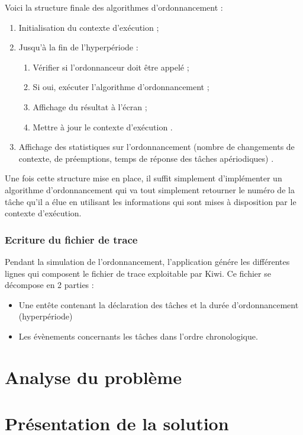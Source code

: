 				Voici la structure finale des algorithmes d'ordonnancement :
				\begin{enumerate}
					\item Initialisation du contexte d'exécution ;
					\item Jusqu'à la fin de l'hyperpériode :
					\begin{enumerate}
						\item Vérifier si l'ordonnanceur doit être appelé ;
						\item Si oui, exécuter l'algorithme d'ordonnancement ;
						\item Affichage du résultat à l'écran ;
						\item Mettre à jour le contexte d'exécution .
					\end{enumerate}
					\item Affichage des statistiques sur l'ordonnancement (nombre de changements de contexte, de préemptions, temps de réponse des tâches apériodiques) .
				\end{enumerate}
				
				Une fois cette structure mise en place, il suffit simplement d'implémenter un algorithme d'ordonnancement qui va tout simplement retourner le numéro de la tâche qu'il a élue en utilisant les informations qui sont mises à disposition par le contexte d'exécution.
			
			\subsection{Ecriture du fichier de trace}
				Pendant la simulation de l'ordonnancement, l'application génére les différentes lignes qui composent le fichier de trace exploitable par Kiwi. Ce fichier se décompose en 2 parties :
					\begin{itemize}
						\item Une entête contenant la déclaration des tâches et la durée d'ordonnancement (hyperpériode)
						\item Les évènements concernants les tâches dans l'ordre chronologique.
					\end{itemize}

	
	
	
\chapter{Analyse du problème}


\chapter{Présentation de la solution}
